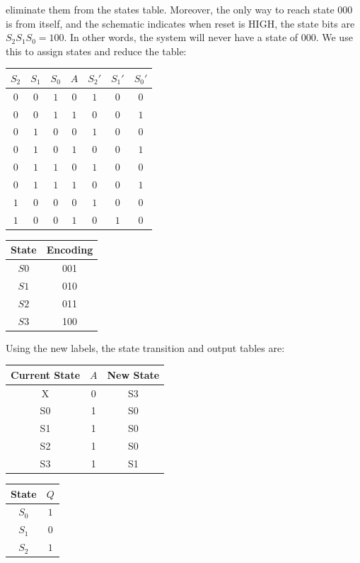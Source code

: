 \documentclass[12pt]{article}
\newenvironment{sol}[1][Solution]{\begin{trivlist}
		\item[\hskip \labelsep {\bfseries #1:}]}{\end{trivlist}}
\begin{document}
\begin{sol}
	eliminate them from the states table. Moreover, the only way to reach
	state $000$ is from itself, and the schematic indicates when
	reset is HIGH, the state bits are $S_2S_1S_0=100$. In other words,
	the system will never have a state of $000$. We use this to assign states
	and reduce the table:
	\begin{center}
		\begin{tabular}{ccc|c|ccc}
			$S_2$ & $S_1$ & $S_0$ & $A$ & $S_2'$ & $S_1'$ & $S_0'$\\
			\hline
			$0$ & $0$ & $1$ & $0$ & $1$ & $0$ & $0$\\
			$0$ & $0$ & $1$ & $1$ & $0$ & $0$ & $1$\\
			$0$ & $1$ & $0$ & $0$ & $1$ & $0$ & $0$\\
			$0$ & $1$ & $0$ & $1$ & $0$ & $0$ & $1$\\
			$0$ & $1$ & $1$ & $0$ & $1$ & $0$ & $0$\\
			$0$ & $1$ & $1$ & $1$ & $0$ & $0$ & $1$\\
			$1$ & $0$ & $0$ & $0$ & $1$ & $0$ & $0$\\
			$1$ & $0$ & $0$ & $1$ & $0$ & $1$ & $0$\\
		\end{tabular}
		\quad
		\begin{tabular}{c|c}
			State & Encoding\\
			\hline
			$S0$ & 001\\
			$S1$ & 010\\
			$S2$ & 011\\
			$S3$ & 100\\
		\end{tabular}
	\end{center}
	Using the new labels, the state transition and output tables are:
	\begin{center}
		\begin{tabular}{c|c|c}
			Current State & $A$ & New State\\
			\hline
			X & 0 & S3\\
			S0 & 1 & S0\\
			S1 & 1 & S0\\
			S2 & 1 & S0\\
			S3 & 1 & S1
		\end{tabular}
		\quad
		\begin{tabular}{c|c}
			State & $Q$\\
			\hline
			$S_0$ & $1$\\
			$S_1$ & $0$\\
			$S_2$ & $1$\\

\end{tabular}
\end{center}
\end{sol}
\end{document}
